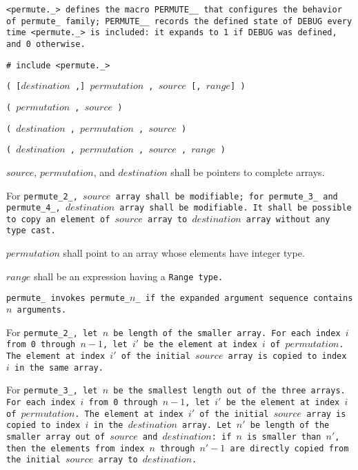 \tt{<permute._>} defines the macro \tt{PERMUTE__} that configures the
behavior of \tt{permute_} family;  \tt{PERMUTE__} records the \tt{defined}
state of \tt{DEBUG} every time \tt{<permute._>} is included:
it expands to \tt{1} if \tt{DEBUG} was defined, and \tt{0} otherwise.


\tt{# include <permute._>}

\s\s\s\tt{(} [$destination$ \tt{,}]
$permutation$ \tt{,} $source$ [\tt{,} $range$] \tt{)}

\s\tt{(} $permutation$ \tt{,} $source$ \tt{)}

\s\tt{(} \phantom{[}$destination$ \tt{,}\phantom{]}
$permutation$ \tt{,} $source$ \tt{)}

\s\tt{(} \phantom{[}$destination$ \tt{,}\phantom{]}
$permutation$ \tt{,} $source$ \phantom{[}\tt{,}  $range$\phantom{]} \tt{)}


$source$, $permutation$, and $destination$ shall be pointers to complete arrays.

For \tt{permute_2_}, $source$ array shall be modifiable;
for \tt{permute_3_} and \tt{permute_4_}, $destination$ array shall be modifiable.
It shall be possible to copy an element of $source$
array to $destination$ array without any type cast.

$permutation$ shall point to an array whose elements have integer type.

$range$ shall be an expression having a \tt{Range} type.


\tt{permute_} invokes  \tt{permute_}$n$\_ if the
expanded argument sequence contains $n$ arguments.

For \tt{permute_2_}, let $n$ be length of the smaller array.
For each index $i$ from 0 through $n - 1$,
let $i'$ be the element at index $i$ of $permutation$.
The element at index $i'$ of the initial $source$
array is copied to index $i$ in the same array.

For \tt{permute_3_}, let $n$ be the smallest length out of the three arrays.
For each index $i$ from 0 through $n - 1$,
let $i'$ be the element at index $i$ of $permutation$.
The element at index $i'$ of the initial $source$ array
is copied to index $i$ in the $destination$ array.
Let $n'$ be length of the smaller array out of $source$ and $destination$:
if $n$ is smaller than $n'$, then the elements from index $n$ through $n' - 1$
are directly copied from the initial $source$ array to $destination$.

